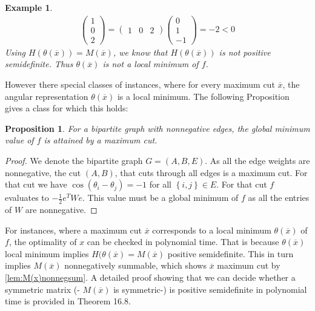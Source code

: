 \documentclass[12pt,a4paper]{article}
\theoremstyle{mythm}
\newtheorem{prop}[thm]{Proposition}
\newtheorem*{exa}{Example}
\begin{document}
\begin{exa}
\begin{align*}
\begin{pmatrix}
1 \\ 
0 \\
2
\end{pmatrix} 
= 
\begin{pmatrix}
1 & 0 & 2
\end{pmatrix} 
\begin{pmatrix}
0 \\
1 \\ 
-1
\end{pmatrix} 
= -2 < 0
\end{align*} 
Using $ H ( \theta ( \overline{ x } ) )= M ( \overline{ x } ) $, we know that $ H ( \theta ( \overline{ x } ) ) $ is not positive semidefinite. Thus $ \theta ( \overline{ x } )
$ is not a local minimum of $ f $.
\end{exa} 
However there special classes of instances, where for every maximum cut $ \overline{ x }  $, the angular representation $ \theta ( \overline{ x } ) $ is a local minimum. 
The following Proposition gives a class for which this holds:
\begin{prop}
For a bipartite graph with nonnegative edges, the global minimum value of $ f $ is attained by a maximum cut.
\end{prop} 
\begin{proof}
We denote the bipartite graph $ G = \left( A,B,E \right)  $.
As all the edge weights are nonnegative, the cut $ ( A, B) $, that cuts through all edges is a maximum cut.
For that cut we have $ \cos( \theta _{ i } - \theta _j ) = -1 $ for all $ \left\{ i,j \right\} \in E $.
For that cut $ f $ evaluates to $ - \frac{ 1 }{ 2 } e ^T W e  $.
This value must be a global minimum of $ f $ as all the entries of $ W $ are nonnegative.
\end{proof}
For instances, where a maximum cut $ \overline{ x }  $ corresponds to a local minimum $ \theta ( \overline{ x } ) $ of $ f $, the optimality of $ x $ can be
checked in polynomial time. That is because $ \theta ( \overline{ x } ) $ local minimum implies $ H ( \theta ( \overline{ x } ) = M ( \overline{ x } ) $ positive
semidefinite. This in turn implies $ M ( \overline{ x } )  $ nonnegatively summable, which shows $ \overline{ x }  $ maximum cut by \ref{lem:M(x)nonnegsum}. 
A detailed proof showing that we can decide whether a symmetric matrix (- $ M ( \overline{ x } ) $ is symmetric-) is positive semidefinite in polynomial time is provided in \cite{Korte2018} Theorem 16.8.
\end{document}
